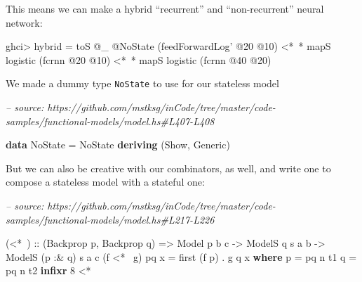 \documentclass[]{article}
\newenvironment{Shaded}{}{}
\newcommand{\CommentTok}[1]{\textcolor[rgb]{0.38,0.63,0.69}{\textit{#1}}}
\newcommand{\DataTypeTok}[1]{\textcolor[rgb]{0.56,0.13,0.00}{#1}}
\newcommand{\DecValTok}[1]{\textcolor[rgb]{0.25,0.63,0.44}{#1}}
\newcommand{\FunctionTok}[1]{\textcolor[rgb]{0.02,0.16,0.49}{#1}}
\newcommand{\KeywordTok}[1]{\textcolor[rgb]{0.00,0.44,0.13}{\textbf{#1}}}
\newcommand{\NormalTok}[1]{#1}
\newcommand{\OtherTok}[1]{\textcolor[rgb]{0.00,0.44,0.13}{#1}}
\begin{document}
This means we can make a hybrid ``recurrent'' and ``non-recurrent'' neural
network:

\begin{Shaded}
\begin{Highlighting}[]
\NormalTok{ghci}\FunctionTok{>}\NormalTok{ hybrid }\FunctionTok{=}\NormalTok{ toS }\FunctionTok{@}\NormalTok{_ }\FunctionTok{@}\DataTypeTok{NoState}\NormalTok{ (feedForwardLog' }\FunctionTok{@}\DecValTok{20} \FunctionTok{@}\DecValTok{10}\NormalTok{)}
          \FunctionTok{<*~*}\NormalTok{ mapS logistic (fcrnn }\FunctionTok{@}\DecValTok{20} \FunctionTok{@}\DecValTok{10}\NormalTok{)}
          \FunctionTok{<*~*}\NormalTok{ mapS logistic (fcrnn }\FunctionTok{@}\DecValTok{40} \FunctionTok{@}\DecValTok{20}\NormalTok{)}
\end{Highlighting}
\end{Shaded}

We made a dummy type \texttt{NoState} to use for our stateless model

\begin{Shaded}
\begin{Highlighting}[]
\CommentTok{-- source: https://github.com/mstksg/inCode/tree/master/code-samples/functional-models/model.hs#L407-L408}

\KeywordTok{data} \DataTypeTok{NoState} \FunctionTok{=} \DataTypeTok{NoState}
  \KeywordTok{deriving}\NormalTok{ (}\DataTypeTok{Show}\NormalTok{, }\DataTypeTok{Generic}\NormalTok{)}
\end{Highlighting}
\end{Shaded}

But we can also be creative with our combinators, as well, and write one to
compose a stateless model with a stateful one:

\begin{Shaded}
\begin{Highlighting}[]
\CommentTok{-- source: https://github.com/mstksg/inCode/tree/master/code-samples/functional-models/model.hs#L217-L226}

\NormalTok{(}\FunctionTok{<*~}\NormalTok{)}
\OtherTok{  ::}\NormalTok{ (}\DataTypeTok{Backprop}\NormalTok{ p, }\DataTypeTok{Backprop}\NormalTok{ q)}
    \OtherTok{=>} \DataTypeTok{Model}\NormalTok{   p         b c}
    \OtherTok{->} \DataTypeTok{ModelS}\NormalTok{       q  s a b}
    \OtherTok{->} \DataTypeTok{ModelS}\NormalTok{ (p }\FunctionTok{:&}\NormalTok{ q) s a c}
\NormalTok{(f }\FunctionTok{<*~}\NormalTok{ g) pq x }\FunctionTok{=}\NormalTok{ first (f p) }\FunctionTok{.}\NormalTok{ g q x}
  \KeywordTok{where}
\NormalTok{    p }\FunctionTok{=}\NormalTok{ pq }\FunctionTok{^^.}\NormalTok{ t1}
\NormalTok{    q }\FunctionTok{=}\NormalTok{ pq }\FunctionTok{^^.}\NormalTok{ t2}
\KeywordTok{infixr} \DecValTok{8} \FunctionTok{<*~}
\end{Highlighting}
\end{Shaded}
\end{document}
